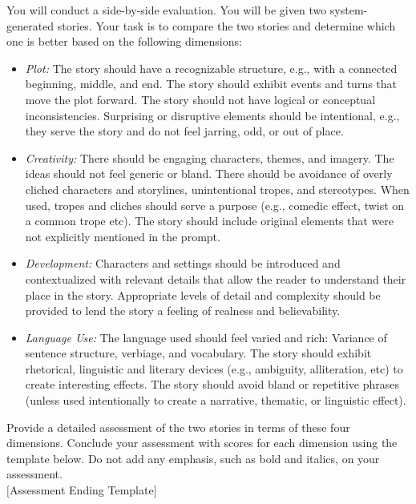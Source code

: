 \documentclass{article}
\begin{document}
\begin{tcolorbox}[colback=white, colframe=my-yellow, coltitle=black, parskip=5mm, title=
\textbf{\textsc{[LLM Evaluator]} Prompt Template}, breakable]
You will conduct a side-by-side evaluation. You will be given two
system-generated stories. Your task is to compare the two stories and
determine which one is better based on the following dimensions:\\
\begin{itemize}
\item \emph{Plot:} The story should have a recognizable structure, e.g., with a
connected beginning, middle, and end. The story should exhibit events and
turns that move the plot forward. The story should not have logical or
conceptual inconsistencies. Surprising or disruptive elements should be
intentional, e.g., they serve the story and do not feel jarring, odd, or
out of place.
\item \emph{Creativity:} There should be engaging characters, themes, and imagery. The
ideas should not feel generic or bland. There should be avoidance of
overly cliched characters and storylines, unintentional tropes, and
stereotypes. When used, tropes and cliches should serve a purpose (e.g.,
comedic effect, twist on a common trope etc). The story should include
original elements that were not explicitly mentioned in the prompt.
\item \emph{Development:} Characters and settings should be introduced and
contextualized with relevant details that allow the reader to understand
their place in the story. Appropriate levels of detail and complexity
should be provided to lend the story a feeling of realness and
believability.
\item \emph{Language Use:} The language used should feel varied and rich: Variance of
sentence structure, verbiage, and vocabulary. The story should exhibit
rhetorical, linguistic and literary devices (e.g., ambiguity,
alliteration, etc) to create interesting effects. The story should avoid
bland or repetitive phrases (unless used intentionally to create a
narrative, thematic, or linguistic effect).
\end{itemize}
\bigskip 

Provide a detailed assessment of the two stories in terms of these four
dimensions. Conclude your assessment with scores for each dimension using
the template below. Do not add any emphasis, such as bold and italics, on
your assessment.\\
$[$Assessment Ending Template$]$\\
\bigskip


\end{tcolorbox}
\end{document}
